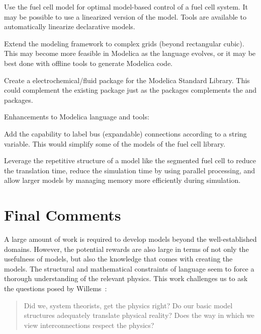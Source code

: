 \begin{itemize*}
  \item Use the fuel cell model for optimal model-based control of a fuel cell system.  It may be possible to use a linearized version of the model.  Tools are available to automatically linearize declarative models.

  \item Extend the modeling framework to complex grids (beyond rectangular cubic).  This may become more feasible in Modelica as the language evolves, or it may be best done with offline tools to generate Modelica code.

  \item Create a  electrochemical\slash{}fluid package for the Modelica Standard Library.  This could complement the existing   package just as the   packages complements the   and  packages.

  \item Enhancements to Modelica language and tools:
  \begin{itemize*}

    \item Add the capability to label bus (expandable) connections according to a string variable.  This would simplify some of the models of the fuel cell library.

    \item Leverage the repetitive structure of a model like the segmented fuel cell to reduce the translation time, reduce the simulation time by using parallel processing, and allow larger models by managing memory more efficiently during simulation.
  \end{itemize*}

\end{itemize*}


\section{Final Comments}

A large amount of work is required to develop  models beyond the well-established domains.  However, the potential rewards are also large in terms of not only the usefulness of  models, but also the knowledge that comes with creating the models.  The structural and mathematical constraints of  language seem to force a thorough understanding of the relevant physics.  This work challenges us to ask the questions posed by Willems~\cite{Willems2007}: 
\begin{quote}
  Did we, system theorists, get the physics right?  Do our basic model structures adequately translate physical reality?  Does the way in which we view interconnections respect the physics?
\end{quote}